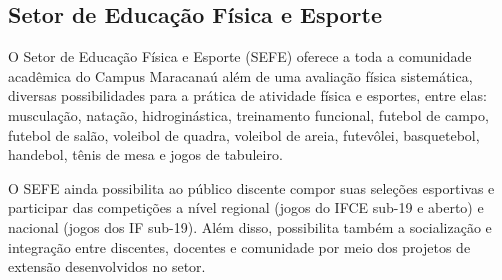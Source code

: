 \subsection{Setor de Educação Física e Esporte}

O Setor de Educação Física e Esporte (SEFE) oferece a toda a comunidade acadêmica do Campus Maracanaú além de uma avaliação física sistemática, diversas possibilidades para a prática de atividade física e esportes, entre elas: musculação, natação, hidroginástica, treinamento funcional, futebol de campo, futebol de salão, voleibol de quadra, voleibol de areia, futevôlei, basquetebol, handebol, tênis de mesa e jogos de tabuleiro.

O SEFE ainda possibilita ao público discente compor suas seleções esportivas e participar das competições a nível regional (jogos do IFCE sub-19 e aberto) e nacional (jogos dos IF sub-19). Além disso, possibilita também a socialização e integração entre discentes, docentes e comunidade por meio dos projetos de extensão desenvolvidos no setor.

